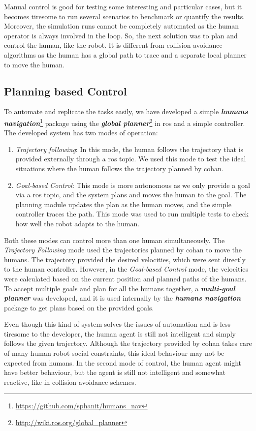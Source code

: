 Manual control is good for testing some interesting and particular cases, but it becomes tiresome to run several scenarios to benchmark or quantify the results. Moreover, the simulation runs cannot be completely automated as the human operator is always involved in the loop. So, the next solution was to plan and control the human, like the robot. It is different from collision avoidance algorithms as the human has a global path to trace and a separate local planner to move the human. 

\subsection{Planning based Control}
To automate and replicate the tasks easily, we have developed a simple \textbf{\textit{humans navigation}}\footnote{\url{https://github.com/sphanit/humans_nav}} package using the \textbf{\textit{global planner}}\footnote{\url{http://wiki.ros.org/global_planner}} in \acrshort{ros} and a simple controller. The developed system has two modes of operation:
\begin{enumerate}
    \item \textit{Trajectory following}: In this mode, the human follows the trajectory that is provided externally through a \acrshort{ros} topic. We used this mode to test the ideal situations where the human follows the trajectory planned by \acrshort{cohan}.
    \item \textit{Goal-based Control}: This mode is more autonomous as we only provide a goal via a \acrshort{ros} topic, and the system plans and moves the human to the goal. The planning module updates the plan as the human moves, and the simple controller traces the path. This mode was used to run multiple tests to check how well the robot adapts to the human.
\end{enumerate}
Both these modes can control more than one human simultaneously. The \textit{Trajectory Following} mode used the trajectories planned by \acrshort{cohan} to move the humans. The trajectory provided the desired velocities, which were sent directly to the human controller. However, in the \textit{Goal-based Control} mode, the velocities were calculated based on the current position and planned paths of the humans. To accept multiple goals and plan for all the humans together, a \textbf{\textit{multi-goal planner}} was developed, and it is used internally by the \textbf{\textit{humans navigation}} package to get plans based on the provided goals.

Even though this kind of system solves the issues of automation and is less tiresome to the developer, the human agent is still not intelligent and simply follows the given trajectory. Although the trajectory provided by \acrshort{cohan} takes care of many human-robot social constraints, this ideal behaviour may not be expected from humans. In the second mode of control, the human agent might have better behaviour, but the agent is still not intelligent and somewhat reactive, like in collision avoidance schemes. 

